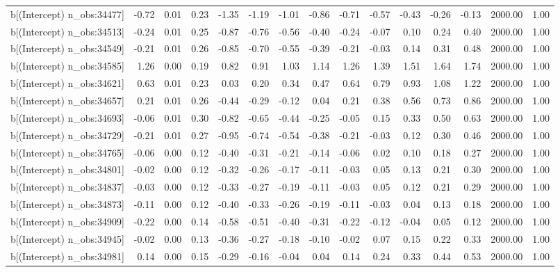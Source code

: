 \begin{table}[ht]
\begin{tabular}{rrrrrrrrrrrrrrr}
  b[(Intercept) n\_obs:34477] & -0.72 & 0.01 & 0.23 & -1.35 & -1.19 & -1.01 & -0.86 & -0.71 & -0.57 & -0.43 & -0.26 & -0.13 & 2000.00 & 1.00 \\ 
  b[(Intercept) n\_obs:34513] & -0.24 & 0.01 & 0.25 & -0.87 & -0.76 & -0.56 & -0.40 & -0.24 & -0.07 & 0.10 & 0.24 & 0.40 & 2000.00 & 1.00 \\ 
  b[(Intercept) n\_obs:34549] & -0.21 & 0.01 & 0.26 & -0.85 & -0.70 & -0.55 & -0.39 & -0.21 & -0.03 & 0.14 & 0.31 & 0.48 & 2000.00 & 1.00 \\ 
  b[(Intercept) n\_obs:34585] & 1.26 & 0.00 & 0.19 & 0.82 & 0.91 & 1.03 & 1.14 & 1.26 & 1.39 & 1.51 & 1.64 & 1.74 & 2000.00 & 1.00 \\ 
  b[(Intercept) n\_obs:34621] & 0.63 & 0.01 & 0.23 & 0.03 & 0.20 & 0.34 & 0.47 & 0.64 & 0.79 & 0.93 & 1.08 & 1.22 & 2000.00 & 1.00 \\ 
  b[(Intercept) n\_obs:34657] & 0.21 & 0.01 & 0.26 & -0.44 & -0.29 & -0.12 & 0.04 & 0.21 & 0.38 & 0.56 & 0.73 & 0.86 & 2000.00 & 1.00 \\ 
  b[(Intercept) n\_obs:34693] & -0.06 & 0.01 & 0.30 & -0.82 & -0.65 & -0.44 & -0.25 & -0.05 & 0.15 & 0.33 & 0.50 & 0.63 & 2000.00 & 1.00 \\ 
  b[(Intercept) n\_obs:34729] & -0.21 & 0.01 & 0.27 & -0.95 & -0.74 & -0.54 & -0.38 & -0.21 & -0.03 & 0.12 & 0.30 & 0.46 & 2000.00 & 1.00 \\ 
  b[(Intercept) n\_obs:34765] & -0.06 & 0.00 & 0.12 & -0.40 & -0.31 & -0.21 & -0.14 & -0.06 & 0.02 & 0.10 & 0.18 & 0.27 & 2000.00 & 1.00 \\ 
  b[(Intercept) n\_obs:34801] & -0.02 & 0.00 & 0.12 & -0.32 & -0.26 & -0.17 & -0.11 & -0.03 & 0.05 & 0.13 & 0.21 & 0.30 & 2000.00 & 1.00 \\ 
  b[(Intercept) n\_obs:34837] & -0.03 & 0.00 & 0.12 & -0.33 & -0.27 & -0.19 & -0.11 & -0.03 & 0.05 & 0.12 & 0.21 & 0.29 & 2000.00 & 1.00 \\ 
  b[(Intercept) n\_obs:34873] & -0.11 & 0.00 & 0.12 & -0.40 & -0.33 & -0.26 & -0.19 & -0.11 & -0.03 & 0.04 & 0.13 & 0.18 & 2000.00 & 1.00 \\ 
  b[(Intercept) n\_obs:34909] & -0.22 & 0.00 & 0.14 & -0.58 & -0.51 & -0.40 & -0.31 & -0.22 & -0.12 & -0.04 & 0.05 & 0.12 & 2000.00 & 1.00 \\ 
  b[(Intercept) n\_obs:34945] & -0.02 & 0.00 & 0.13 & -0.36 & -0.27 & -0.18 & -0.10 & -0.02 & 0.07 & 0.15 & 0.22 & 0.33 & 2000.00 & 1.00 \\ 
  b[(Intercept) n\_obs:34981] & 0.14 & 0.00 & 0.15 & -0.29 & -0.16 & -0.04 & 0.04 & 0.14 & 0.24 & 0.33 & 0.44 & 0.53 & 2000.00 & 1.00 \\ 

\end{tabular}
\end{table}

